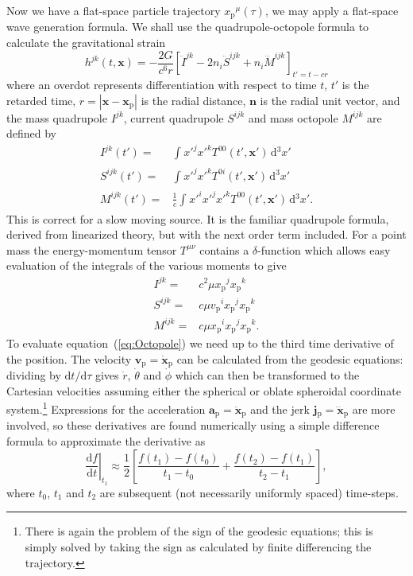 \documentclass[a4paper, 11pt, titlepage, twoside]{report}
\newcommand{\eqnref}[1]{equation~(\ref{eq:#1})}
\newcommand{\sub}[1]{\ensuremath{_\mathrm{#1}}}
\newcommand{\recip}[1]{\ensuremath{\frac{1}{#1}}}
\newcommand{\dd}{\ensuremath{\mathrm{d}}}
\newcommand{\diff}[2]{\ensuremath{\frac{\dd {#1}}{\dd {#2}}}}
\newcommand{\linediff}[2]{\ensuremath{\dd {#1}/\dd {#2}}}
\newcommand{\intd}[4]{\ensuremath{\int_{#1}^{#2}{#3}\,\dd{#4}}}
\begin{document}
Now we have a flat-space particle trajectory ${x\sub{p}}^\mu(\tau)$, we may apply a flat-space wave generation formula. We shall use the quadrupole-octopole formula to calculate the gravitational strain\cite{Press1977, Bekenstein1973}
\begin{equation}
h^{jk}(t, \boldsymbol{x}) = -\frac{2G}{c^6r}\left[\ddot{I}^{jk} - 2n_i\ddot{S}^{ijk} + n_i\dddot{M}^{ijk}\right]_{t' = t - cr}
\label{eq:Octopole}
\end{equation}
where an overdot represents differentiation with respect to time $t$, $t'$ is the retarded time, $r = \left|\boldsymbol{x} - \boldsymbol{x}\sub{p}\right|$ is the radial distance, $\boldsymbol{n}$ is the radial unit vector, and the mass quadrupole ${I}^{jk}$, current quadrupole ${S}^{ijk}$ and mass octopole ${M}^{ijk}$ are defined by
\begin{align}
{I}^{jk}(t') = {} & \intd{}{}{{x'}^j{x'}^kT^{00}(t', \boldsymbol{x'})}{^3x'}\\
{S}^{ijk}(t') = {} & \intd{}{}{{x'}^j{x'}^kT^{0i}(t', \boldsymbol{x'})}{^3x'}\\
{M}^{ijk}(t') = {} & \recip{c}\intd{}{}{{x'}^i{x'}^j{x'}^kT^{00}(t', \boldsymbol{x'})}{^3x'}.
\end{align}
This is correct for a slow moving source. It is the familiar quadrupole formula\cite{Misner1973, Hobson2006}, derived from linearized theory, but with the next order term included. For a point mass the energy-momentum tensor $T^{\mu\nu}$ contains a $\delta$-function which allows easy evaluation of the integrals of the various moments to give
\begin{align}
{I}^{jk} = {} & c^2\mu x\sub{p}^jx\sub{p}^k\\
{S}^{ijk} = {} & c\mu v\sub{p}^ix\sub{p}^jx\sub{p}^k\\
{M}^{ijk} = {} & c\mu x\sub{p}^ix\sub{p}^jx\sub{p}^k.
\end{align}
To evaluate \eqnref{Octopole} we need up to the third time derivative of the position. The velocity $\boldsymbol{v}\sub{p} = \dot{\boldsymbol{x}}\sub{p}$ can be calculated from the geodesic equations: dividing by $\linediff{t}{\tau}$ gives $\dot{r}$, $\dot{\theta}$ and $\dot{\phi}$ which can then be transformed to the Cartesian velocities assuming either the spherical or oblate spheroidal coordinate system.\footnote{There is again the problem of the sign of the geodesic equations; this is simply solved by taking the sign as calculated by finite differencing the trajectory.} Expressions for the acceleration $\boldsymbol{a}\sub{p} = \ddot{\boldsymbol{x}}\sub{p}$ and the jerk $\boldsymbol{j}\sub{p} = \dddot{\boldsymbol{x}}\sub{p}$ are more involved, so these derivatives are found numerically using a simple difference formula to approximate the derivative as
\begin{equation}
\left.\diff{f}{t}\right|_{t_1} \approx \recip{2}\left[\frac{f(t_1) - f(t_0)}{t_1 - t_0} + \frac{f(t_2) - f(t_1)}{t_2 - t_1}\right],
\end{equation}
where $t_0$, $t_1$ and $t_2$ are subsequent (not necessarily uniformly spaced) time-steps.
\end{document}

